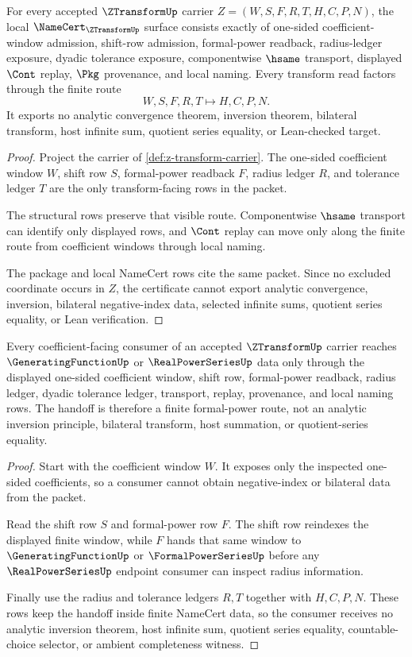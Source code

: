 \begin{theorem}
\label{thm:z-transform-namecert-obligations}
For every accepted $\ZTransformUp$ carrier $Z=(W,S,F,R,T,H,C,P,N)$, the local $\NameCert_{\ZTransformUp}$ surface consists exactly of one-sided coefficient-window admission, shift-row admission, formal-power readback, radius-ledger exposure, dyadic tolerance exposure, componentwise $\hsame$ transport, displayed $\Cont$ replay, $\Pkg$ provenance, and local naming. Every transform read factors through the finite route
$$
W,S,F,R,T \longmapsto H,C,P,N .
$$
It exports no analytic convergence theorem, inversion theorem, bilateral transform, host infinite sum, quotient series equality, or Lean-checked target.
\end{theorem}
\begin{proof}
Project the carrier of \autoref{def:z-transform-carrier}. The one-sided coefficient window $W$, shift row $S$, formal-power readback $F$, radius ledger $R$, and tolerance ledger $T$ are the only transform-facing rows in the packet.

The structural rows preserve that visible route. Componentwise $\hsame$ transport can identify only displayed rows, and $\Cont$ replay can move only along the finite route from coefficient windows through local naming.

The package and local NameCert rows cite the same packet. Since no excluded coordinate occurs in $Z$, the certificate cannot export analytic convergence, inversion, bilateral negative-index data, selected infinite sums, quotient series equality, or Lean verification.
\end{proof}

\begin{theorem}
\label{thm:z-transform-generating-function-handoff}
Every coefficient-facing consumer of an accepted $\ZTransformUp$ carrier reaches $\GeneratingFunctionUp$ or $\RealPowerSeriesUp$ data only through the displayed one-sided coefficient window, shift row, formal-power readback, radius ledger, dyadic tolerance ledger, transport, replay, provenance, and local naming rows. The handoff is therefore a finite formal-power route, not an analytic inversion principle, bilateral transform, host summation, or quotient-series equality.
\end{theorem}
\begin{proof}
Start with the coefficient window $W$. It exposes only the inspected one-sided coefficients, so a consumer cannot obtain negative-index or bilateral data from the packet.

Read the shift row $S$ and formal-power row $F$. The shift row reindexes the displayed finite window, while $F$ hands that same window to $\GeneratingFunctionUp$ or $\FormalPowerSeriesUp$ before any $\RealPowerSeriesUp$ endpoint consumer can inspect radius information.

Finally use the radius and tolerance ledgers $R,T$ together with $H,C,P,N$. These rows keep the handoff inside finite NameCert data, so the consumer receives no analytic inversion theorem, host infinite sum, quotient series equality, countable-choice selector, or ambient completeness witness.
\end{proof}

